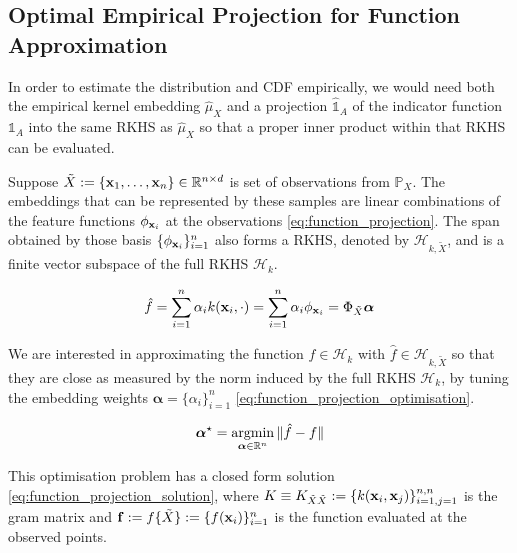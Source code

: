 \documentclass[twoside]{article} \usepackage{aistats2017}
\theoremstyle{definition}
\newcommand{\argmin}{\operatornamewithlimits{argmin}}
\newcommand{\rv}[1]{{#1}}
\newcommand{\ds}[1]{\tilde{#1}}
\begin{document}
	\subsection{Optimal Empirical Projection for Function Approximation}
	\label{sec:discriminative_quantile_regression:optimal_function_approximation}
	
		In order to estimate the distribution and CDF empirically, we would need both the empirical kernel embedding $\hat{\mu}_{\rv{X}}$ and a projection $\hat{\mathbb{1}}_{A}$ of the indicator function $\mathbb{1}_{A}$ into the same RKHS as $\hat{\mu}_{\rv{X}}$ so that a proper inner product within that RKHS can be evaluated.

		Suppose $\ds{X} := \{\bvec{x}_{1}, \dots, \bvec{x}_{n}\} \in \mathbb{R}^{n \times d}$ is set of observations from $\mathbb{P}_{\rv{X}}$. The embeddings that can be represented by these samples are linear combinations of the feature functions $\phi_{\mathbf{x}_{i}}$ at the observations \eqref{eq:function_projection}. The span obtained by those basis $\{\phi_{\mathbf{x}_{i}}\}_{i = 1}^{n}$ also forms a RKHS, denoted by $\mathcal{H}_{k, \ds{X}}$, and is a finite vector subspace of the full RKHS $\mathcal{H}_{k}$.
		
		\begin{equation}
			\hat{f} = \sum_{i = 1}^{n} \alpha_{i} k(\bvec{x}_{i}, \cdot) = \sum_{i = 1}^{n} \alpha_{i} \phi_{\bvec{x}_{i}} = \Phi_{\ds{X}} \bm{\alpha}
		\label{eq:function_projection}
		\end{equation}
	
		We are interested in approximating the function $f \in \mathcal{H}_{k}$ with $\hat{f} \in \mathcal{H}_{k, \ds{X}}$ so that they are close as measured by the norm induced by the full RKHS $\mathcal{H}_{k}$, by tuning the embedding weights $\bm{\alpha} = \{\alpha_{i}\}_{i = 1}^{n}$ \eqref{eq:function_projection_optimisation}.
			
		\begin{equation}
			\bm{\alpha}^{\star} = \argmin_{\bm{\alpha} \in \mathbb{R}^{n}} \Vert \hat{f} - f \Vert
		\label{eq:function_projection_optimisation}
		\end{equation}
		
		This optimisation problem has a closed form solution \eqref{eq:function_projection_solution}, where $K \equiv K_{\ds{X} \ds{X}} := \{k(\bvec{x}_{i}, \bvec{x}_{j})\}_{i = 1, j = 1}^{n, n}$ is the gram matrix and $\bvec{f} := f\{\ds{X}\} := \{f(\bvec{x}_{i})\}_{i = 1}^{n}$ is the function evaluated at the observed points.
		
\end{document}
